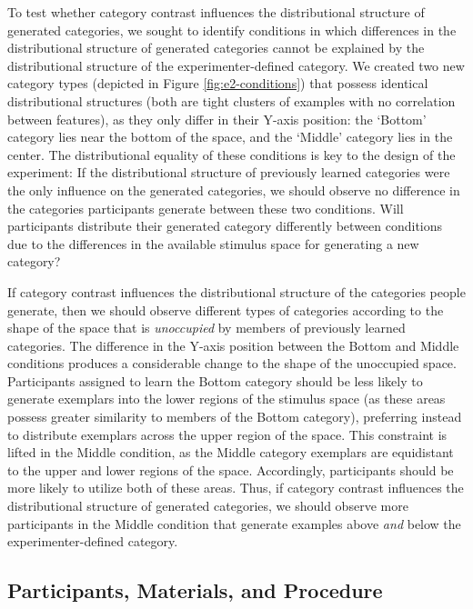 \documentclass[12pt]{article}
\begin{document}
\begin{flushleft}
To test whether category contrast influences the distributional structure of
generated categories, we sought to identify conditions in which differences in
the distributional structure of generated categories cannot be explained by the
distributional structure of the experimenter-defined category. We created two
new category types (depicted in Figure \ref{fig:e2-conditions}) that possess
identical distributional structures (both are tight clusters of examples with no
correlation between features), as they only differ in their Y-axis position: the
`Bottom' category lies near the bottom of the space, and the `Middle'
category lies in the center. The distributional equality of these conditions is
key to the design of the experiment: If the distributional structure of
previously learned categories were the only influence on the generated
categories, we should observe no difference in the categories participants
generate between these two conditions. Will participants distribute their
generated category differently between conditions due to the differences in the
available stimulus space for generating a new category?

If category contrast influences the distributional structure of the categories
people generate, then we should observe different types of categories according
to the shape of the space that is {\em unoccupied} by members of previously
learned categories. The difference in the Y-axis position between the Bottom and
Middle conditions produces a considerable change to the shape of the unoccupied
space. Participants assigned to learn the Bottom category should be less likely
to generate exemplars into the lower regions of the stimulus space (as these
areas possess greater similarity to members of the Bottom category), preferring
instead to distribute exemplars across the upper region of the space. This
constraint is lifted in the Middle condition, as the Middle category exemplars
are equidistant to the upper and lower regions of the space. Accordingly,
participants should be more likely to utilize both of these areas. Thus, if
category contrast influences the distributional structure of generated
categories, we should observe more participants in the Middle condition that
generate examples above {\em and} below the experimenter-defined category.


\subsection{Participants, Materials, and Procedure}


\end{flushleft}
\end{document}
